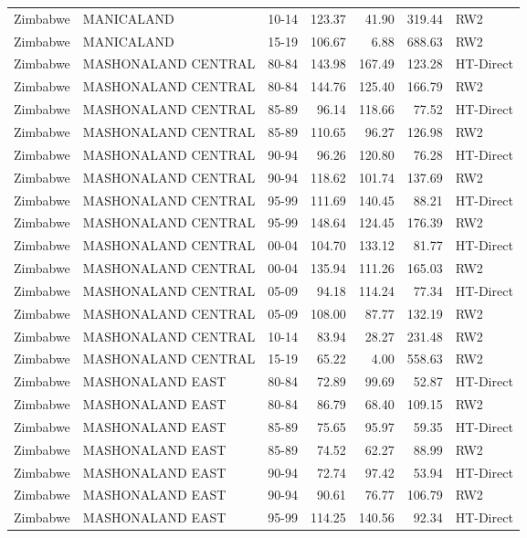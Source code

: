 \begin{longtable}{lllrrrl}
  Zimbabwe & MANICALAND & 10-14 & 123.37 & 41.90 & 319.44 & RW2 \\ 
  Zimbabwe & MANICALAND & 15-19 & 106.67 & 6.88 & 688.63 & RW2 \\ 
  Zimbabwe & MASHONALAND CENTRAL & 80-84 & 143.98 & 167.49 & 123.28 & HT-Direct \\ 
  Zimbabwe & MASHONALAND CENTRAL & 80-84 & 144.76 & 125.40 & 166.79 & RW2 \\ 
  Zimbabwe & MASHONALAND CENTRAL & 85-89 & 96.14 & 118.66 & 77.52 & HT-Direct \\ 
  Zimbabwe & MASHONALAND CENTRAL & 85-89 & 110.65 & 96.27 & 126.98 & RW2 \\ 
  Zimbabwe & MASHONALAND CENTRAL & 90-94 & 96.26 & 120.80 & 76.28 & HT-Direct \\ 
  Zimbabwe & MASHONALAND CENTRAL & 90-94 & 118.62 & 101.74 & 137.69 & RW2 \\ 
  Zimbabwe & MASHONALAND CENTRAL & 95-99 & 111.69 & 140.45 & 88.21 & HT-Direct \\ 
  Zimbabwe & MASHONALAND CENTRAL & 95-99 & 148.64 & 124.45 & 176.39 & RW2 \\ 
  Zimbabwe & MASHONALAND CENTRAL & 00-04 & 104.70 & 133.12 & 81.77 & HT-Direct \\ 
  Zimbabwe & MASHONALAND CENTRAL & 00-04 & 135.94 & 111.26 & 165.03 & RW2 \\ 
  Zimbabwe & MASHONALAND CENTRAL & 05-09 & 94.18 & 114.24 & 77.34 & HT-Direct \\ 
  Zimbabwe & MASHONALAND CENTRAL & 05-09 & 108.00 & 87.77 & 132.19 & RW2 \\ 
  Zimbabwe & MASHONALAND CENTRAL & 10-14 & 83.94 & 28.27 & 231.48 & RW2 \\ 
  Zimbabwe & MASHONALAND CENTRAL & 15-19 & 65.22 & 4.00 & 558.63 & RW2 \\ 
  Zimbabwe & MASHONALAND EAST & 80-84 & 72.89 & 99.69 & 52.87 & HT-Direct \\ 
  Zimbabwe & MASHONALAND EAST & 80-84 & 86.79 & 68.40 & 109.15 & RW2 \\ 
  Zimbabwe & MASHONALAND EAST & 85-89 & 75.65 & 95.97 & 59.35 & HT-Direct \\ 
  Zimbabwe & MASHONALAND EAST & 85-89 & 74.52 & 62.27 & 88.99 & RW2 \\ 
  Zimbabwe & MASHONALAND EAST & 90-94 & 72.74 & 97.42 & 53.94 & HT-Direct \\ 
  Zimbabwe & MASHONALAND EAST & 90-94 & 90.61 & 76.77 & 106.79 & RW2 \\ 
  Zimbabwe & MASHONALAND EAST & 95-99 & 114.25 & 140.56 & 92.34 & HT-Direct \\ 

\end{longtable}
